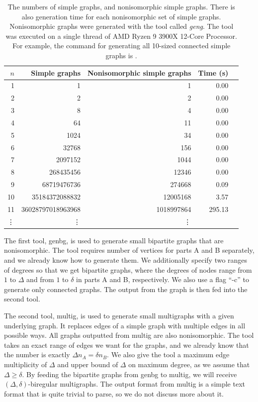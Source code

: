 \begin{table}[H]
  \centering
  \begin{tabular}{r|rrrr}
    \toprule
    $n$&Simple graphs & Nonisomorphic simple graphs & Time (s)\\
    \midrule
    1  &1                 & 1 & 0.00\\
    2  &2                 & 2 & 0.00\\
    3  &8                 & 4 & 0.00\\
    4  &64                & 11 & 0.00\\
    5  &1024              & 34 & 0.00\\
    6  &32768             & 156 & 0.00\\
    7  &2097152           & 1044 & 0.00\\
    8  &268435456         & 12346 & 0.00\\
    9  &68719476736       & 274668   & 0.09\\
    10 &35184372088832    & 12005168 & 3.57\\
    11 &36028797018963968 &1018997864&295.13\\
    \vdots & \vdots &\vdots\\
    \bottomrule
  \end{tabular}
  \caption{%
    The numbers of simple graphs, and nonisomorphic simple graphs.
    There is also generation time for each nonisomorphic set of simple graphs.
    Nonisomorphic graphs were generated with the tool called \emph{geng}.
    The tool was executed on a single thread of AMD Ryzen 9 3900X 12-Core Processor.
    For example, the command for generating all 10-sized connected simple graphs is .
  }
  \label{tbl:graph_count_nonisomorphic}
\end{table}

The first tool, genbg, is used to generate small bipartite graphs that are nonisomorphic.
The tool requires number of vertices for parts A and B separately, and we already know how to generate them.
We additionally specify two ranges of degrees so that we get bipartite graphs, where the degrees of nodes range from $1$ to $\Delta$ and from $1$ to $\delta$ in parts A and B, respectively.
We also use a flag ``-c'' to generate only connected graphs.
The output from the graph is then fed into the second tool.

The second tool, multig, is used to generate small multigraphs with a given underlying graph.
It replaces edges of a simple graph with multiple edges in all possible ways.
All graphs outputted from multig are also nonisomorphic.
The tool takes an exact range of edges we want for the graphs, and we already know that the number is exactly $\Delta n_A = \delta n_B$.
We also give the tool a maximum edge multiplicity of $\Delta$ and upper bound of $\Delta$ on maximum degree, as we assume that $\Delta \geq \delta$.
By feeding the bipartite graphs from genbg to multig, we will receive $(\Delta, \delta)$-biregular multigraphs.
The output format from multig is a simple text format that is quite trivial to parse, so we do not discuss more about it.

